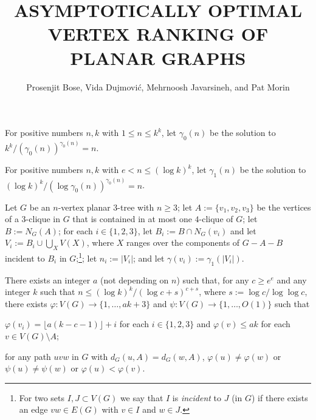 \documentclass[kpfonts]{patmorin}
\title{\MakeUppercase{Asymptotically Optimal Vertex Ranking of Planar Graphs}}
\author{Prosenjit Bose, Vida Dujmović, Mehrnoosh Javarsineh, and Pat Morin}
\theoremstyle{named}
\begin{document}
\maketitle

For positive numbers $n,k$ with $1\le n \le k^k$, let $\gamma_0(n)$ be the solution to $k^k/(\gamma_0(n))^{\gamma_0(n)} = n$.

For positive numbers $n,k$ with $e< n \le (\log k)^k$, let $\gamma_1(n)$ be the solution to $(\log k)^k/(\log \gamma_0(n))^{\gamma_0(n)} = n$.

Let $G$ be an $n$-vertex planar 3-tree with $n\ge 3$;  let $A:=\{v_1,v_2,v_3\}$ be the vertices of a 3-clique in $G$ that is contained in at most one $4$-clique of $G$; let $B:=N_G(A)$; for each $i\in\{1,2,3\}$, let $B_i:=B\cap N_G(v_i)$ and let $V_i:=B_i\cup \bigcup_X V(X)$, where $X$ ranges over the components of $G-A-B$ incident to $B_i$ in $G$;\footnote{For two sets $I,J\subset V(G)$ we say that $I$ is \emph{incident} to $J$ (in $G$) if there exists an edge $vw\in E(G)$ with $v\in I$ and $w\in J$.}; let $n_i:=|V_i|$; and let $\gamma(v_i):=\gamma_1(|V_i|)$.

\begin{lem}
    There exists an integer $a$ (not depending on $n$) such that, for any $c\ge e^e$ and any integer $k$ such that $n\le (\log k)^k/(\log c+s)^{c+s}$, where $s:=\log c/\log\log c$, there exists $\varphi:V(G)\to\{1,\ldots,ak+3\}$ and $\psi:V(G)\to\{1,\ldots,O(1)\}$ such that
    \begin{compactenum}[(R1)]
        \item $\varphi(v_i)=\lfloor a(k-c-1)\rfloor+i$ for each $i\in\{1,2,3\}$ and $\varphi(v)\le ak$ for each $v\in V(G)\setminus A$; \label{outer-triangle}
        \item for any path $uvw$ in $G$ with $d_G(u,A)=d_G(w,A)$, $\varphi(u)\neq\varphi(w)$ or $\psi(u)\neq\psi(w)$ or $\varphi(u)<\varphi(v)$.\label{ranking}
    \end{compactenum}
\end{lem}
\end{document}
